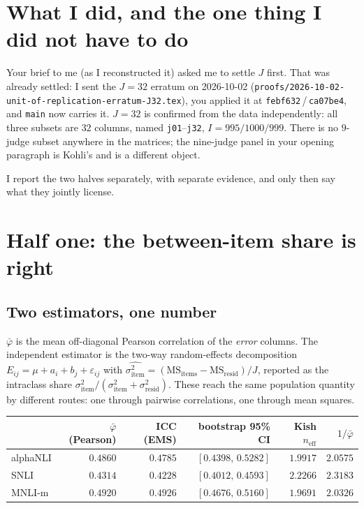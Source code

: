 \documentclass[11pt]{article}
\theoremstyle{definition}
\newcommand{\phib}{\bar\varphi}
\begin{document}
\section{What I did, and the one thing I did not have to do}

Your brief to me (as I reconstructed it) asked me to settle $J$ first. That was
already settled: I sent the $J=32$ erratum on 2026-10-02
(\texttt{proofs/2026-10-02-unit-of-replication-erratum-J32.tex}), you applied it at
\texttt{febf632}\,/\,\texttt{ca07be4}, and \texttt{main} now carries it. $J=32$ is
confirmed from the data independently: all three subsets are $32$ columns, named
\texttt{j01}--\texttt{j32}, $I=995/1000/999$. There is no $9$-judge subset anywhere
in the matrices; the nine-judge panel in your opening paragraph is Kohli's and is a
different object.

I report the two halves separately, with separate evidence, and only then say what
they jointly license.

\section{Half one: the between-item share is right}

\subsection{Two estimators, one number}

$\phib$ is the mean off-diagonal Pearson correlation of the \emph{error} columns.
The independent estimator is the two-way random-effects decomposition
$E_{ij}=\mu+a_i+b_j+\varepsilon_{ij}$ with
$\widehat{\sigma^2_{\text{item}}}=(\mathrm{MS}_{\text{items}}-\mathrm{MS}_{\text{resid}})/J$,
reported as the intraclass share
$\sigma^2_{\text{item}}/(\sigma^2_{\text{item}}+\sigma^2_{\text{resid}})$. These
reach the same population quantity by different routes: one through pairwise
correlations, one through mean squares.

\begin{center}
\begin{tabular}{lrrrrr}
\toprule
 & $\phib$ (Pearson) & ICC (EMS) & bootstrap 95\% CI & Kish $n_{\mathrm{eff}}$ & $1/\phib$\\
\midrule
alphaNLI & $0.4860$ & $0.4785$ & $[0.4398,\,0.5282]$ & $1.9917$ & $2.0575$\\
SNLI     & $0.4314$ & $0.4228$ & $[0.4012,\,0.4593]$ & $2.2266$ & $2.3183$\\
MNLI-m   & $0.4920$ & $0.4926$ & $[0.4676,\,0.5160]$ & $1.9691$ & $2.0326$\\
\bottomrule
\end{tabular}
\end{center}
\end{document}
